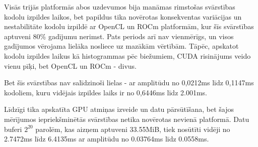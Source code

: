 Visās trijās platformās abos uzdevumos bija manāmas rimstošas svārstības
kodolu izpildes laikos, bet papildus tika novērotas konsekventas variācijas un
nestabilitāte kodolu izpildē ar OpenCL un ROCm platformām, kur šīs svārstības
aptuveni 80\% gadījumu nerimst. Pats periods arī nav vienmērīgs, un visos
gadījumos vērojama lielāka nosliece uz mazākām vērtībām. Tāpēc, apskatot
kodolu izpildes laikus kā histogrammas pēc biežumiem, CUDA risinājums veido
vienu pīķi, bet OpenCL un ROCm - divus.

Bet šīs svārstības nav salīdzinoši lielas - ar amplitūdu no 0,0212\si{\ms} līdz
0,1147\si{\ms} kodoliem, kuru vidējais izpildes laiks ir no 0,6446\si{\ms} līdz
2.001\si{\ms}.

Līdzīgi tika apskatīta GPU atmiņas izveide un datu pārsūtīšana, bet šajos
mērījumos iepriekšminētās svārstības netika novērotas nevienā platformā. Datu
buferi \(2^{20}\) parolēm, kas aizņem aptuveni 33.55MiB, tiek nosūtīti vidēji
no 2.7472\si{\ms} līdz 6.4135\si{\ms} ar amplitūdu no 0.03764\si{\ms}  līdz
0.0558\si{\ms}.
